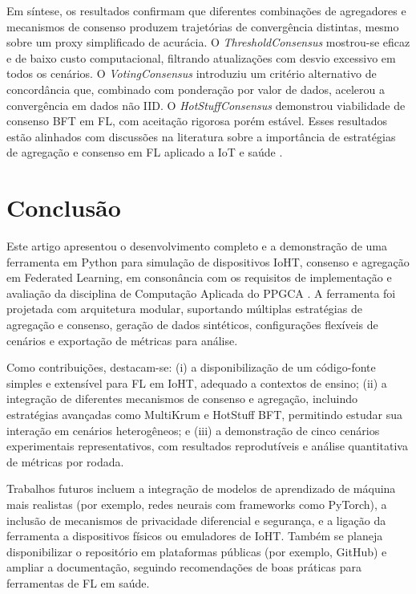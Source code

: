 \documentclass[12pt]{article}
\begin{document}
Em síntese, os resultados confirmam que diferentes combinações de agregadores e mecanismos de consenso produzem trajetórias de convergência distintas, mesmo sobre um proxy simplificado de acurácia. O \textit{ThresholdConsensus} mostrou-se eficaz e de baixo custo computacional, filtrando atualizações com desvio excessivo em todos os cenários. O \textit{VotingConsensus} introduziu um critério alternativo de concordância que, combinado com ponderação por valor de dados, acelerou a convergência em dados não IID. O \textit{HotStuffConsensus} demonstrou viabilidade de consenso BFT em FL, com aceitação rigorosa porém estável. Esses resultados estão alinhados com discussões na literatura sobre a importância de estratégias de agregação e consenso em FL aplicado a IoT e saúde .

\section{Conclusão}
\label{sec:conclusao}

Este artigo apresentou o desenvolvimento completo e a demonstração de uma ferramenta em Python para simulação de dispositivos IoHT, consenso e agregação em Federated Learning, em consonância com os requisitos de implementação e avaliação da disciplina de Computação Aplicada do PPGCA \cite{Kumar2020_SecureIoHT,Nevrataki2023_SurveyFLApplications}. A ferramenta foi projetada com arquitetura modular, suportando múltiplas estratégias de agregação e consenso, geração de dados sintéticos, configurações flexíveis de cenários e exportação de métricas para análise.

Como contribuições, destacam-se: (i) a disponibilização de um código-fonte simples e extensível para FL em IoHT, adequado a contextos de ensino; (ii) a integração de diferentes mecanismos de consenso e agregação, incluindo estratégias avançadas como MultiKrum e HotStuff BFT, permitindo estudar sua interação em cenários heterogêneos; e (iii) a demonstração de cinco cenários experimentais representativos, com resultados reprodutíveis e análise quantitativa de métricas por rodada.

Trabalhos futuros incluem a integração de modelos de aprendizado de máquina mais realistas (por exemplo, redes neurais com frameworks como PyTorch), a inclusão de mecanismos de privacidade diferencial e segurança, e a ligação da ferramenta a dispositivos físicos ou emuladores de IoHT. Também se planeja disponibilizar o repositório em plataformas públicas (por exemplo, GitHub) e ampliar a documentação, seguindo recomendações de boas práticas para ferramentas de FL em saúde.



\end{document}
